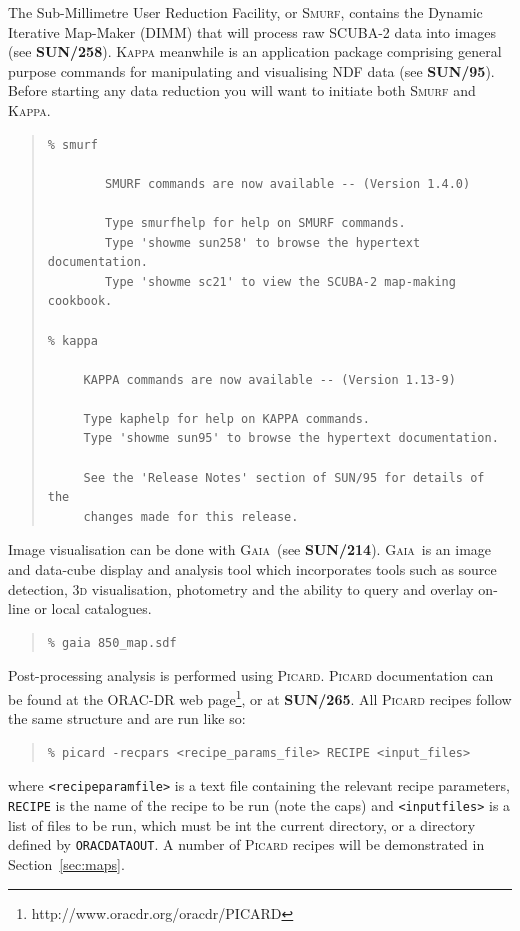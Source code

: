 \documentclass[twoside,11pt]{article}
\newcommand{\htmladdnormallinkfoot}[2]{#1\footnote{#2}}
\newcommand{\xref}[3]{#1}
\renewcommand{\_}{\texttt{\symbol{95}}}
\newenvironment{myquote}{\begin{quote}\begin{small}}{\end{small}\end{quote}}
\newcommand{\gaia}{\xref{\textsc{Gaia}}{sun214}{}}
\newcommand{\param}[1]{\texttt{#1}}
\newcommand{\gaiasun}{\xref{\textbf{SUN/214}}{sun214}{}}
\newcommand{\kappasun}{\xref{\textbf{SUN/95}}{sun95}{}}
\newcommand{\picardsun}{\xref{\textbf{SUN/265}}{sun265}{}}
\newcommand{\smurfsun}{\xref{\textbf{SUN/258}}{sun258}{}}
\begin{document}
The Sub-Millimetre User Reduction Facility, or \textsc{Smurf}, contains the
Dynamic Iterative Map-Maker (DIMM) that will process raw SCUBA-2 data
into images (see \smurfsun). \textsc{Kappa} meanwhile is an application
package comprising general purpose commands for manipulating and
visualising NDF data (see \kappasun). Before starting any data
reduction you will want to initiate both \textsc{Smurf} and \textsc{Kappa}.
\begin{myquote}
\begin{verbatim}
% smurf

        SMURF commands are now available -- (Version 1.4.0)

        Type smurfhelp for help on SMURF commands.
        Type 'showme sun258' to browse the hypertext documentation.
        Type 'showme sc21' to view the SCUBA-2 map-making cookbook.

% kappa

     KAPPA commands are now available -- (Version 1.13-9)

     Type kaphelp for help on KAPPA commands.
     Type 'showme sun95' to browse the hypertext documentation.

     See the 'Release Notes' section of SUN/95 for details of the
     changes made for this release.
\end{verbatim}
\end{myquote}
Image visualisation can be done with \gaia\ (see \gaiasun). \gaia\ is an
image and data-cube display and analysis tool which incorporates tools such
as source detection, 3\textsc{d} visualisation, photometry and the ability
to query and overlay on-line or local catalogues.
\begin{myquote}
\begin{verbatim}
% gaia 850_map.sdf
\end{verbatim}
\end{myquote}

Post-processing analysis is performed using \textsc{Picard}. \textsc{Picard} documentation can be
found at \htmladdnormallinkfoot{the ORAC-DR web page}{http://www.oracdr.org/oracdr/PICARD},
or at \picardsun. All \textsc{Picard} recipes follow the same structure and are run like so:
\begin{myquote}
\begin{verbatim}
% picard -recpars <recipe_params_file> RECIPE <input_files>
\end{verbatim}
\end{myquote}
where \param{<recipe\_param\_file>} is a text file containing the
relevant recipe parameters, \param{RECIPE} is the name of the recipe
to be run (note the caps) and \param{<input\_files>} is a list of
files to be run, which must be int the current directory, or a
directory defined by \param{ORAC\_DATA\_OUT}. A number of \textsc{Picard}
recipes will be demonstrated in Section~\ref{sec:maps}.
\end{document}

